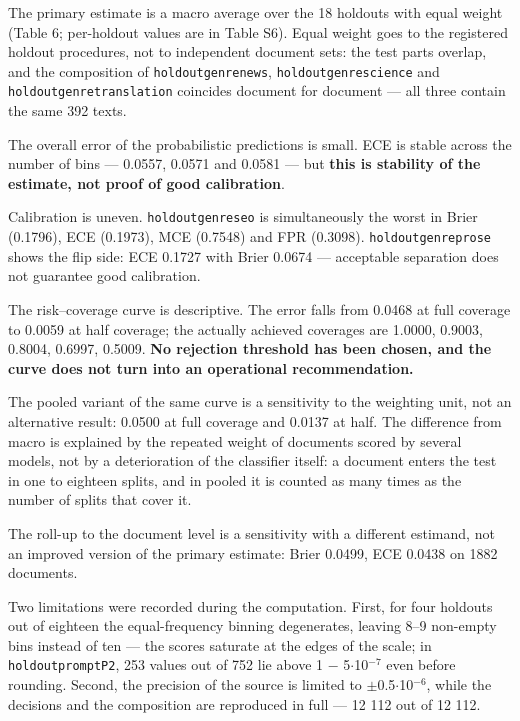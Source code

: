 \documentclass[11pt,a4paper]{article}
\renewcommand{\_}{\textunderscore\allowbreak}
\begin{document}
The primary estimate is a macro average over the 18 holdouts with equal weight
(Table 6; per-holdout values are in Table S6). Equal weight goes to the
registered holdout procedures, not to independent document sets: the test
parts overlap, and the composition of \texttt{holdout\_genre\_news},
\texttt{holdout\_genre\_science} and \texttt{holdout\_genre\_translation} coincides document for
document — all three contain the same 392 texts.

\setcounter{table}{5}


The overall error of the probabilistic predictions is small. ECE is stable
across the number of bins — 0.0557, 0.0571 and 0.0581 — but \textbf{this is
stability of the estimate, not proof of good calibration}.

Calibration is uneven. \texttt{holdout\_genre\_seo} is simultaneously the worst in
Brier (0.1796), ECE (0.1973), MCE (0.7548) and FPR (0.3098).
\texttt{holdout\_genre\_prose} shows the flip side: ECE 0.1727 with Brier 0.0674 —
acceptable separation does not guarantee good calibration.

The risk–coverage curve is descriptive. The error falls from 0.0468 at full
coverage to 0.0059 at half coverage; the actually achieved coverages are
1.0000, 0.9003, 0.8004, 0.6997, 0.5009. \textbf{No rejection threshold has been
chosen, and the curve does not turn into an operational recommendation.}

The pooled variant of the same curve is a sensitivity to the weighting unit,
not an alternative result: 0.0500 at full coverage and 0.0137 at half. The
difference from macro is explained by the repeated weight of documents scored
by several models, not by a deterioration of the classifier itself: a document
enters the test in one to eighteen splits, and in pooled it is counted as many
times as the number of splits that cover it.

The roll-up to the document level is a sensitivity with a different estimand,
not an improved version of the primary estimate: Brier 0.0499, ECE 0.0438 on
1882 documents.

Two limitations were recorded during the computation. First, for four holdouts
out of eighteen the equal-frequency binning degenerates, leaving 8–9 non-empty
bins instead of ten — the scores saturate at the edges of the scale; in
\texttt{holdout\_prompt\_P2}, 253 values out of 752 lie above 1 $-$ 5$\cdot$10$^{-7}$ even before
rounding. Second, the precision of the source is limited to $\pm$0.5$\cdot$10$^{-6}$, while
the decisions and the composition are reproduced in full — 12 112 out of
12 112.
\end{document}
